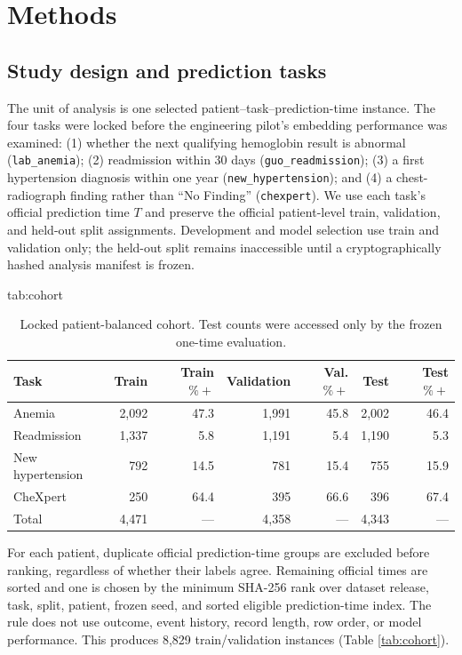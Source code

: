 \documentclass[pmlr,twocolumn,10pt]{jmlr}
\begin{document}
\section{Methods}
\label{sec:methods}

\subsection{Study design and prediction tasks}

The unit of analysis is one selected patient--task--prediction-time instance.
The four tasks were locked before the engineering pilot's embedding performance
was examined: (1) whether the next qualifying hemoglobin result is abnormal
(\texttt{lab\_anemia}); (2) readmission within 30 days
(\texttt{guo\_readmission}); (3) a first hypertension diagnosis within one year
(\texttt{new\_hypertension}); and (4) a chest-radiograph finding rather than
``No Finding'' (\texttt{chexpert}). We use each task's official prediction time
$T$ and preserve the official patient-level train, validation, and held-out
split assignments. Development and model selection use train and validation
only; the held-out split remains inaccessible until a cryptographically hashed
analysis manifest is frozen.

\begin{table}[t]
\floatconts
  {tab:cohort}
  {\caption{Locked patient-balanced cohort. Test counts were accessed only by
  the frozen one-time evaluation.}}
  {\begin{tabular}{lrrrrrr}
  \toprule
  Task & Train & Train $\%+$ & Validation & Val. $\%+$ & Test & Test $\%+$ \\
  \midrule
  Anemia & 2,092 & 47.3 & 1,991 & 45.8 & 2,002 & 46.4 \\
  Readmission & 1,337 & 5.8 & 1,191 & 5.4 & 1,190 & 5.3 \\
  New hypertension & 792 & 14.5 & 781 & 15.4 & 755 & 15.9 \\
  CheXpert & 250 & 64.4 & 395 & 66.6 & 396 & 67.4 \\
  \midrule
  Total & 4,471 & --- & 4,358 & --- & 4,343 & --- \\
  \bottomrule
  \end{tabular}}
\end{table}

For each patient, duplicate official prediction-time groups are excluded before
ranking, regardless of whether their labels agree. Remaining official times are
sorted and one is chosen by the minimum SHA-256 rank over dataset release,
task, split, patient, frozen seed, and sorted eligible prediction-time index.
The rule does not use outcome, event history, record length, row order, or model
performance. This produces 8,829 train/validation instances (Table
\ref{tab:cohort}).
\end{document}
